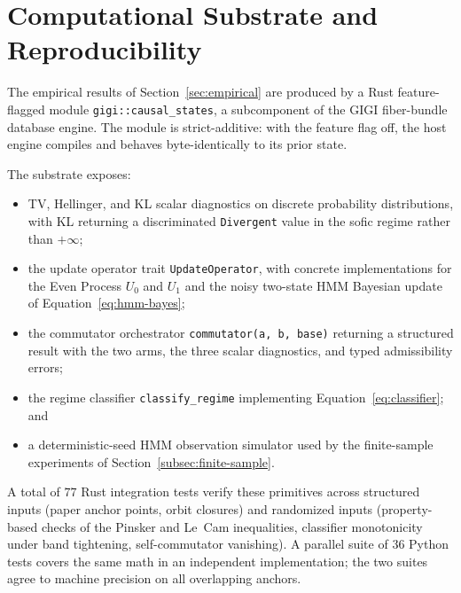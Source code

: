 \documentclass[11pt,a4paper]{article}
\theoremstyle{plain}
\theoremstyle{definition}
\theoremstyle{remark}
\begin{document}
\appendix

\section{Computational Substrate and Reproducibility}
\label{app:substrate}

The empirical results of Section~\ref{sec:empirical} are produced by a Rust feature-flagged module \texttt{gigi::causal\_states}, a subcomponent of the GIGI fiber-bundle database engine. The module is strict-additive: with the feature flag off, the host engine compiles and behaves byte-identically to its prior state.

The substrate exposes:
\begin{itemize}[itemsep=2pt,topsep=2pt]
    \item TV, Hellinger, and KL scalar diagnostics on discrete probability distributions, with KL returning a discriminated \texttt{Divergent} value in the sofic regime rather than $+\infty$;
    \item the update operator trait \texttt{UpdateOperator}, with concrete implementations for the Even Process $U_0$ and $U_1$ and the noisy two-state HMM Bayesian update of Equation~\eqref{eq:hmm-bayes};
    \item the commutator orchestrator \texttt{commutator(a,~b,~base)} returning a structured result with the two arms, the three scalar diagnostics, and typed admissibility errors;
    \item the regime classifier \texttt{classify\_regime} implementing Equation~\eqref{eq:classifier}; and
    \item a deterministic-seed HMM observation simulator used by the finite-sample experiments of Section~\ref{subsec:finite-sample}.
\end{itemize}

A total of $77$ Rust integration tests verify these primitives across structured inputs (paper anchor points, orbit closures) and randomized inputs (property-based checks of the Pinsker and Le~Cam inequalities, classifier monotonicity under band tightening, self-commutator vanishing). A parallel suite of $36$ Python tests covers the same math in an independent implementation; the two suites agree to machine precision on all overlapping anchors.
\end{document}
